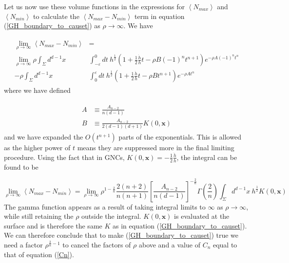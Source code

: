 \documentclass[12pt]{article}
\newcommand{\be}{\begin{equation}}
\newcommand{\ee}{\end{equation}}
\begin{document}
Let us now use these volume functions in the expressions for $\left\langle N_{max}\right\rangle$ and $\left\langle N_{min}\right\rangle$ to calculate the $\left\langle N_{max}-N_{min}\right\rangle$ term in equation (\ref{GH_boundary_to_causet}) as $\rho \rightarrow \infty$. We have

\begin{gather}\label{eq:nmax_eq:nmin_start}
\begin{aligned}
\lim_{\rho \to \infty}\left\langle N_{max}-N_{min} \right\rangle &= \\
\lim_{\rho \to \infty}\rho
\int_{\Sigma}d^{d-1}x & \int_{-\varepsilon}^{0}dt\
h^{\frac{1}{2}}\left(1+
\frac{1}{2}\frac{\dot{h}}{h}t-\rho B(-1)^{n}t^{n+1}\right)e^{-\rho A(-1)^{n}t^{n}} \\
-\rho\int_{\Sigma}d^{d-1}x &
\int_{0}^{\varepsilon}dt\
h^{\frac{1}{2}}\left(1+
\frac{1}{2}\frac{\dot{h}}{h}t-\rho Bt^{n+1}\right)e^{-\rho At^{n}}
\end{aligned}
\end{gather}
where we have defined

\begin{gather}\label{A_and_B_defn}
\begin{aligned}
A & \equiv \frac{A_{n-2}}{n(d-1)} \\
B & \equiv \frac{A_{n-2}}{2(d-1)(d+1)}K(0,\mathbf{x})
\end{aligned}
\end{gather}
and we have expanded the $O(t^{n+1})$ parts of the exponentials. This is allowed as the higher power of $t$ means they are suppressed more in the final limiting procedure. Using the fact that in GNCs, $K(0,\mathbf{x})=-\frac{1}{2}\frac{\dot{h}}{h}$, the integral can be found to be

\be\label{eq:nmax_eq:nmin_end}
\lim_{\rho \to \infty}\left\langle N_{max}-N_{min} \right\rangle=\lim_{\rho \to \infty}
\rho^{1-\frac{2}{n}}\frac{2(n+2)}{n(n+1)}
\left[\frac{A_{n-2}}{n(d-1)}\right]^{-\frac{2}{n}}
\Gamma\left(\frac{2}{n}\right)\int_{\Sigma}d^{d-1}x\
h^{\frac{1}{2}}K(0,\mathbf{x})
\ee
The gamma function appears as a result of taking integral limits to $\infty$ as $\rho\rightarrow\infty$, while still retaining the $\rho$ outside the integral. $K(0,\mathbf{x})$ is evaluated at the surface and is therefore the same $K$ as in equation (\ref{GH_boundary_to_causet}). We can therefore conclude that to make (\ref{GH_boundary_to_causet}) true we need a factor $\rho^{\frac{2}{n}-1}$ to cancel the factors of $\rho$ above and a value of $C_n$ equal to that of equation (\ref{Cn}).
\end{document}
